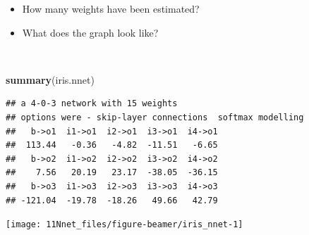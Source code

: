 \documentclass[10pt,ignorenonframetext,]{beamer}
\newenvironment{Shaded}{\begin{snugshade}}{\end{snugshade}}
\newcommand{\KeywordTok}[1]{\textcolor[rgb]{0.13,0.29,0.53}{\textbf{#1}}}
\newcommand{\NormalTok}[1]{#1}
\begin{document}
\begin{frame}[fragile]

\begin{itemize}
\item
  How many weights have been estimated?
\item
  What does the graph look like?
\end{itemize}

\(~\)

\scriptsize

\begin{Shaded}
\begin{Highlighting}[]
\KeywordTok{summary}\NormalTok{(iris.nnet)}
\end{Highlighting}
\end{Shaded}

\begin{verbatim}
## a 4-0-3 network with 15 weights
## options were - skip-layer connections  softmax modelling 
##   b->o1  i1->o1  i2->o1  i3->o1  i4->o1 
##  113.44   -0.36   -4.82  -11.51   -6.65 
##   b->o2  i1->o2  i2->o2  i3->o2  i4->o2 
##    7.56   20.19   23.17  -38.05  -36.15 
##   b->o3  i1->o3  i2->o3  i3->o3  i4->o3 
## -121.04  -19.78  -18.26   49.66   42.79
\end{verbatim}

\end{frame}

\begin{frame}

\begin{center}\texttt{[image: 11Nnet\_files/figure-beamer/iris\_nnet-1]} \end{center}

\end{frame}
\end{document}
